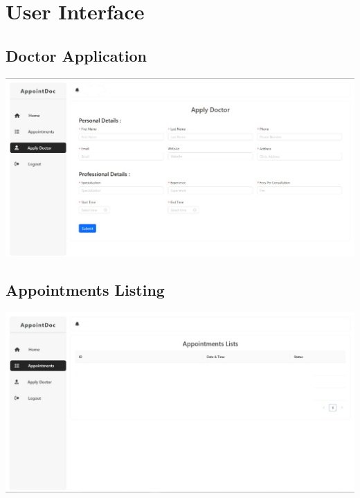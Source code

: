 \documentclass[a4paper, 12pt]{article}
\begin{document}
\section{User Interface}

\subsection{Doctor Application}
\begin{center}
\includegraphics[width=1\textwidth]{apply.jpg}\par
\end{center}

\subsection{Appointments Listing}
\begin{center}
\includegraphics[width=1\textwidth]{appoint.jpg}\par
\end{center}
\end{document}
